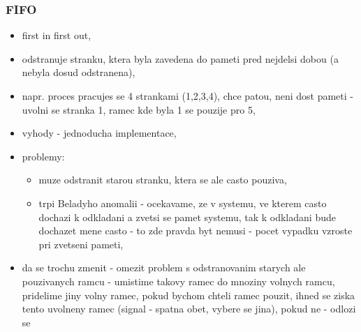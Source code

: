 \documentclass[a4paper, 11pt]{article}
\begin{document}
\subsubsection{FIFO}
\begin{itemize}
    \item first in first out,
    \item odstranuje stranku, ktera byla zavedena do pameti pred nejdelsi dobou (a nebyla dosud odstranena),
    \item napr. proces pracujes se 4 strankami (1,2,3,4), chce patou, neni dost pameti - uvolni se stranka 1, ramec kde byla 1 se pouzije pro 5,
    \item vyhody - jednoducha implementace,
    \item problemy:
    \begin{itemize}
        \item muze odstranit starou stranku, ktera se ale casto pouziva,
        \item trpi Beladyho anomalii - ocekavame, ze v systemu, ve kterem casto dochazi k odkladani a zvetsi se pamet systemu, tak k odkladani bude dochazet mene casto - to zde pravda byt nemusi - pocet vypadku vzroste pri zvetseni pameti,
    \end{itemize}
    \item da se trochu zmenit - omezit problem s odstranovanim starych ale pouzivanych ramcu - umistime takovy ramec do mnoziny volnych ramcu, pridelime jiny volny ramec, pokud bychom chteli ramec pouzit, ihned se ziska tento uvolneny ramec (signal - spatna obet, vybere se jina), pokud ne - odlozi se \\
\end{itemize}
\end{document}
